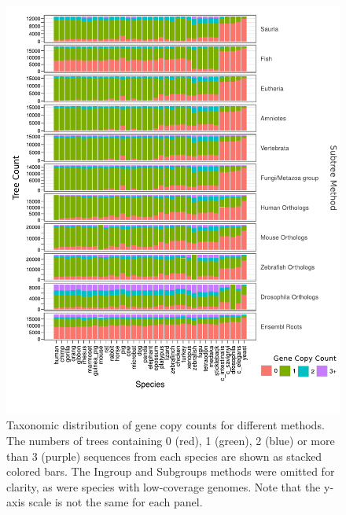 \begin{figure}
\centering
\includegraphics[scale=0.9]{Figs/tax_ens_roots.pdf}
\caption{Taxonomic distribution of gene copy counts for different
  \subtr methods. The numbers of trees containing 0 (red), 1 (green),
  2 (blue) or more than 3 (purple) sequences from each species are
  shown as stacked colored bars. The Ingroup and Subgroups methods
  were omitted for clarity, as were species with low-coverage
  genomes. Note that the y-axis scale is not the same for each panel.}
\label{ortholog_stacked_bar}
\end{figure}


